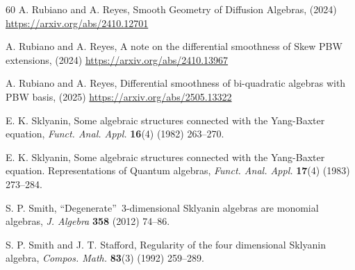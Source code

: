 \documentclass{amsart}
\theoremstyle{definition}
\theoremstyle{remark}
\numberwithin{equation}{section}
\begin{document}
\begin{thebibliography}{60}
 A. Rubiano and A. Reyes, Smooth Geometry of Diffusion Algebras, (2024) \url{https://arxiv.org/abs/2410.12701}

 A. Rubiano and A. Reyes, A note on the differential smoothness of Skew PBW extensions, (2024) \url{https://arxiv.org/abs/2410.13967}

 A. Rubiano and A. Reyes, Differential smoothness of bi-quadratic algebras with PBW basis, (2025) \url{https://arxiv.org/abs/2505.13322}



 E. K. Sklyanin, Some algebraic structures connected with the {Y}ang-{B}axter equation, {\em Funct. Anal. Appl.} {\bf 16}(4) (1982) 263--270.

 E. K. Sklyanin, Some algebraic structures connected with the {Y}ang-{B}axter equation. {R}epresentations of {Q}uantum algebras, {\em Funct. Anal. Appl.} {\bf 17}(4) (1983) 273--284.


 S. P. Smith, \textquotedblleft {D}egenerate\textquotedblright \ 3-dimensional \uppercase{S}klyanin algebras are monomial algebras, {\em J. Algebra} {\bf 358} (2012) 74--86.

 S. P. Smith and J. T. Stafford, Regularity of the four dimensional \uppercase{S}klyanin algebra, {\em Compos. Math.} {\bf 83}(3) (1992) 259--289.




\end{thebibliography}
\end{document}
